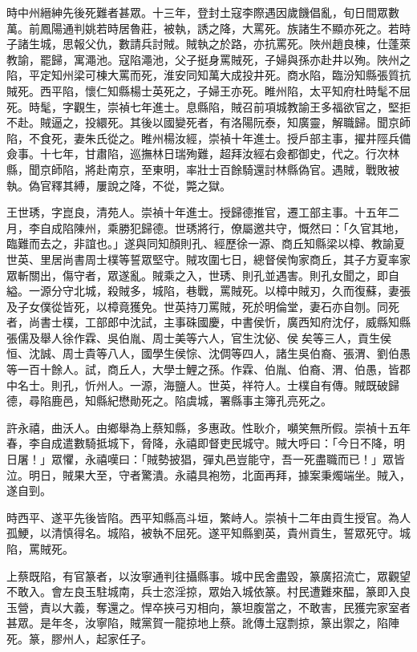 \begin{pinyinscope}
時中州縉紳先後死難者甚眾。十三年，登封土寇李際遇因歲饑倡亂，旬日間眾數萬。前鳳陽通判姚若時居魯莊，被執，誘之降，大罵死。族諸生不顯亦死之。若時子諸生城，思報父仇，數請兵討賊。賊執之於路，亦抗罵死。陜州趙良棟，仕蓬萊教諭，罷歸，寓澠池。寇陷澠池，父子挺身罵賊死，子婦與孫亦赴井以殉。陜州之陷，平定知州梁可棟大罵而死，淮安同知萬大成投井死。商水陷，臨汾知縣張質抗賊死。西平陷，懷仁知縣楊士英死之，子婦王亦死。睢州陷，太平知府杜時髦不屈死。時髦，字觀生，崇禎七年進士。息縣陷，賊召前項城教諭王多福欲官之，堅拒不赴。賊逼之，投繯死。其後以國變死者，有洛陽阮泰，知廣靈，解職歸。聞京師陷，不食死，妻朱氏從之。睢州楊汝經，崇禎十年進士。授戶部主事，擢井陘兵備僉事。十七年，甘肅陷，巡撫林日瑞殉難，超拜汝經右僉都御史，代之。行次林縣，聞京師陷，將赴南京，至東明，率壯士百餘騎還討林縣偽官。遇賊，戰敗被執。偽官釋其縛，屢說之降，不從，斃之獄。

王世琇，字崑良，清苑人。崇禎十年進士。授歸德推官，遷工部主事。十五年二月，李自成陷陳州，乘勝犯歸德。世琇將行，僚屬邀共守，慨然曰：「久官其地，臨難而去之，非誼也。」遂與同知顏則孔、經歷徐一源、商丘知縣梁以樟、教諭夏世英、里居尚書周士樸等誓眾堅守。賊攻圍七日，總督侯恂家商丘，其子方夏率家眾斬關出，傷守者，眾遂亂。賊乘之入，世琇、則孔並遇害。則孔女聞之，即自縊。一源分守北城，殺賊多，城陷，巷戰，罵賊死。以樟中賊刃，久而復蘇，妻張及子女僕從皆死，以樟竟獲免。世英持刀罵賊，死於明倫堂，妻石亦自刎。同死者，尚書士樸，工部郎中沈試，主事硃國慶，中書侯忻，廣西知府沈仔，威縣知縣張儒及舉人徐作霖、吳伯胤、周士美等六人，官生沈佖、侯矣等三人，貢生侯恒、沈誠、周士貴等八人，國學生侯悰、沈倜等四人，諸生吳伯裔、張渭、劉伯愚等一百十餘人。試，商丘人，大學士鯉之孫。作霖、伯胤、伯裔、渭、伯愚，皆郡中名士。則孔，忻州人。一源，海鹽人。世英，祥符人。士樸自有傳。賊既破歸德，尋陷鹿邑，知縣紀懋勛死之。陷虞城，署縣事主簿孔亮死之。

許永禧，曲沃人。由鄉舉為上蔡知縣，多惠政。性耿介，嚬笑無所假。崇禎十五年春，李自成遣數騎抵城下，脅降，永禧即督吏民城守。賊大呼曰：「今日不降，明日屠！」眾懼，永禧嘆曰：「賊勢披猖，彈丸邑豈能守，吾一死盡職而已！」眾皆泣。明日，賊果大至，守者驚潰。永禧具袍笏，北面再拜，據案秉燭端坐。賊入，遂自剄。

時西平、遂平先後皆陷。西平知縣高斗垣，繁峙人。崇禎十二年由貢生授官。為人孤鯁，以清慎得名。城陷，被執不屈死。遂平知縣劉英，貴州貢生，誓眾死守。城陷，罵賊死。

上蔡既陷，有官篆者，以汝寧通判往攝縣事。城中民舍盡毀，篆廣招流亡，眾觀望不敢入。會左良玉駐城南，兵士恣淫掠，眾始入城依篆。村民遭難來醖，篆即入良玉營，責以大義，奪還之。悍卒挾弓刃相向，篆坦腹當之，不敢害，民獲完家室者甚眾。是年冬，汝寧陷，賊黨賀一龍掠地上蔡。訛傳土寇剽掠，篆出禦之，陷陣死。篆，膠州人，起家任子。


\end{pinyinscope}
